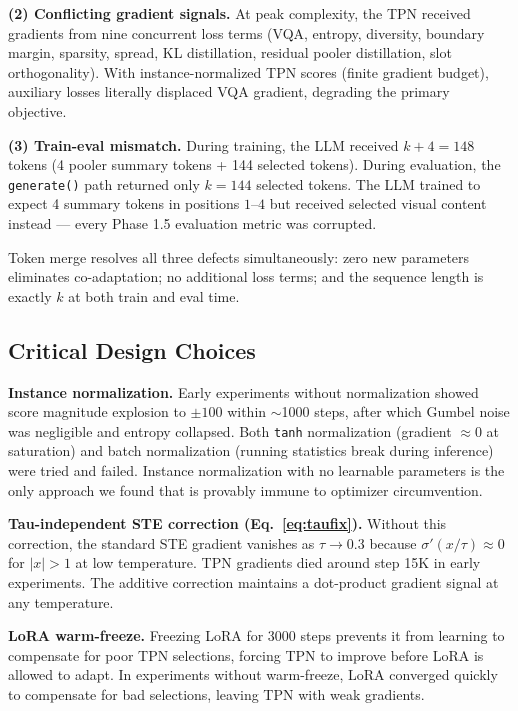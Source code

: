 \documentclass{article}
\begin{document}
\textbf{(2) Conflicting gradient signals.}
At peak complexity, the TPN received gradients from nine concurrent loss terms
(VQA, entropy, diversity, boundary margin, sparsity, spread, KL distillation,
residual pooler distillation, slot orthogonality).
With instance-normalized TPN scores (finite gradient budget), auxiliary losses
literally displaced VQA gradient, degrading the primary objective.

\textbf{(3) Train-eval mismatch.}
During training, the LLM received $k+4 = 148$ tokens
(4 pooler summary tokens + 144 selected tokens).
During evaluation, the \texttt{generate()} path returned only $k=144$ selected tokens.
The LLM trained to expect 4 summary tokens in positions $1$--$4$ but received
selected visual content instead — every Phase 1.5 evaluation metric was corrupted.

Token merge resolves all three defects simultaneously: zero new parameters eliminates
co-adaptation; no additional loss terms; and the sequence length is exactly $k$
at both train and eval time.

\subsection{Critical Design Choices}

\textbf{Instance normalization.}
Early experiments without normalization showed score magnitude explosion to $\pm100$
within $\sim$1000 steps, after which Gumbel noise was negligible and entropy collapsed.
Both \texttt{tanh} normalization (gradient $\approx 0$ at saturation) and batch
normalization (running statistics break during inference) were tried and failed.
Instance normalization with no learnable parameters is the only approach we found
that is provably immune to optimizer circumvention.

\textbf{Tau-independent STE correction (Eq.~\ref{eq:taufix}).}
Without this correction, the standard STE gradient vanishes as $\tau \to 0.3$ because
$\sigma'(x/\tau) \approx 0$ for $|x| > 1$ at low temperature.
TPN gradients died around step 15K in early experiments.
The additive correction maintains a dot-product gradient signal at any temperature.

\textbf{LoRA warm-freeze.}
Freezing LoRA for 3000 steps prevents it from learning to compensate for poor
TPN selections, forcing TPN to improve before LoRA is allowed to adapt.
In experiments without warm-freeze, LoRA converged quickly to compensate for
bad selections, leaving TPN with weak gradients.
\end{document}
